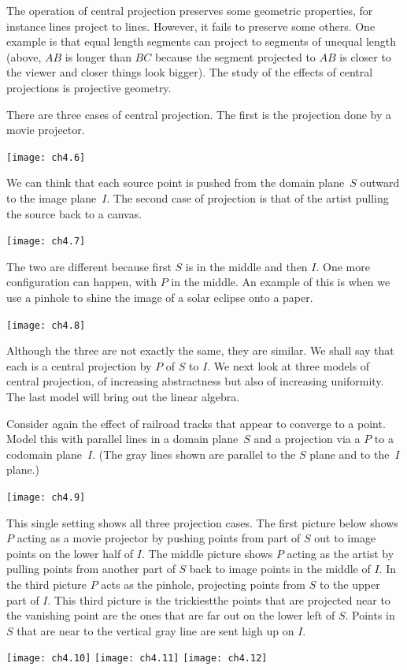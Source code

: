The operation of  
central projection preserves some geometric 
properties, for instance lines project to lines.
However, it fails to preserve some others.
One example is that equal 
length segments can project to segments of unequal length 
(above, $AB$ is longer than $BC$ because the
segment projected to $AB$ is closer to the viewer and 
closer things look bigger).
The study of the effects of central projections is projective geometry.

There are three cases of central projection.
The first is the projection done by a movie projector.
\begin{center}
  \texttt{[image: ch4.6]}
\end{center}
We can think that each source point is pushed from the domain plane~$S$
outward to the image plane~$I$.
The second case of projection is that of the artist
pulling the source back to a canvas.
\begin{center}
  \texttt{[image: ch4.7]}
\end{center}
The two are different because first $S$ is in the middle
and then $I$.
One more configuration can happen, with $P$ in the middle. 
An example of this is when we use a pinhole to shine the 
image of a solar eclipse onto a paper.
\begin{center}
  \texttt{[image: ch4.8]}
\end{center}

Although the three are not exactly the same,  
they are similar.
We shall say that 
each is a central projection by $P$ of
$S$ to $I$.
We next look at three models of central projection, 
of increasing abstractness but
also of increasing uniformity.
The last model will bring out the linear algebra.

Consider again the effect of railroad tracks  
that appear to converge to a point.
Model this with parallel lines in a domain plane~$S$
and a projection via a $P$ to a codomain plane~$I$. 
(The gray lines shown are parallel to the $S$ plane and to the~$I$ plane.)
\begin{center}
  \texttt{[image: ch4.9]}
\end{center}
This single setting shows all three projection cases.
The first picture below shows $P$ acting as a movie projector by pushing
points from part of $S$ out to image points on the lower half of $I$.
The middle picture shows $P$ acting as the artist by 
pulling points from another part of $S$ back to  
image points in the middle of $I$.
In the third picture $P$ acts as the pinhole, projecting points from $S$
to the upper part of $I$.
This third picture is the trickiest\Dash the points that are
projected near to the vanishing point are the ones that are 
far out on the lower left of $S$. 
Points in $S$ that are near to the vertical gray line
are sent high up on $I$.
\begin{center}
  \texttt{[image: ch4.10]}
\hfil
  \texttt{[image: ch4.11]}
\hfil
  \texttt{[image: ch4.12]}
\end{center}

